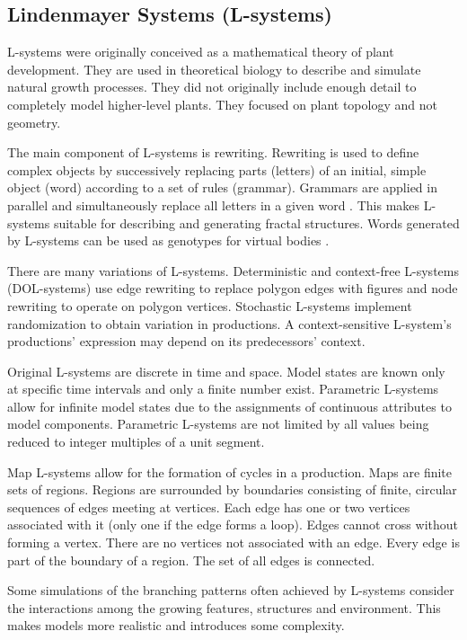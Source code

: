 \subsection{Lindenmayer Systems (L-systems)}

L-systems were originally conceived as a mathematical theory of plant development. They are used in theoretical biology to describe and simulate natural growth processes. They did not originally include enough detail to completely model higher-level plants. They focused on plant topology and not geometry. \cite{Kolodziej2002,Prusinkiewicz2004}

The main component of L-systems is rewriting. Rewriting is used to define complex objects by successively replacing parts (letters) of an initial, simple object (word) according to a set of rules (grammar). Grammars are applied in parallel and simultaneously replace all letters in a given word \cite{Prusinkiewicz2004}. This makes L-systems suitable for describing and generating fractal structures. Words generated by L-systems can be used as genotypes for virtual bodies \cite{Kolodziej2002}.

There are many variations of L-systems. Deterministic and context-free L-systems (DOL-systems) use edge rewriting to replace polygon edges with figures and node rewriting to operate on polygon vertices. Stochastic L-systems implement randomization to obtain variation in productions. A context-sensitive L-system's productions' expression may depend on its predecessors' context.  \cite{Prusinkiewicz2004}

Original L-systems are discrete in time and space. Model states are known only at specific time intervals and only a finite number exist. Parametric L-systems allow for infinite model states due to the assignments of continuous attributes to model components. Parametric L-systems are not limited by all values being reduced to integer multiples of a unit segment. \cite{Prusinkiewicz2004}

Map L-systems allow for the formation of cycles in a production. Maps are finite sets of regions. Regions are surrounded by boundaries consisting of finite, circular sequences of edges meeting at vertices. Each edge has one or two vertices associated with it (only one if the edge forms a loop). Edges cannot cross without forming a vertex. There are no vertices not associated with an edge. Every edge is part of the boundary of a region. The set of all edges is connected. \cite{Prusinkiewicz2004}

Some simulations of the branching patterns often achieved by L-systems consider the interactions among the growing features, structures and environment. This makes models more realistic and introduces some complexity. \cite{Prusinkiewicz2004}


